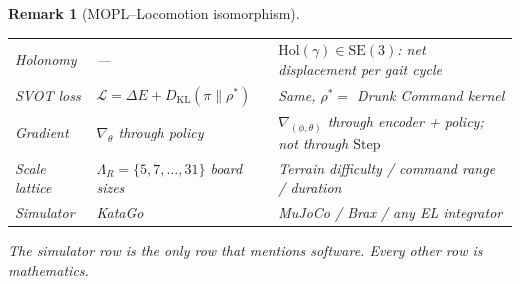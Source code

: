 \documentclass[11pt,a4paper]{article}
\newtheorem{remark}[theorem]{Remark}
\newcommand{\cL}{\mathcal{L}}
\newcommand{\DKL}{D_{\mathrm{KL}}}
\begin{document}
\begin{remark}[MOPL--Locomotion isomorphism]
\begin{center}
\begin{tabular}{@{}lp{4.8cm}p{5.8cm}@{}}
Holonomy
  & ---
  & $\mathrm{Hol}(\gamma) \in \mathrm{SE}(3)$:
    net displacement per gait cycle \\[3pt]
SVOT loss
  & $\cL = \Delta E
    + \DKL(\pi \| \rho^*)$
  & Same, $\rho^* = $ Drunk Command kernel \\[3pt]
Gradient
  & $\nabla_\theta$ through policy
  & $\nabla_{(\phi,\theta)}$ through
    encoder + policy; not through
    $\mathrm{Step}$ \\[3pt]
Scale lattice
  & $\Lambda_R = \{5,7,\ldots,31\}$
    board sizes
  & Terrain difficulty / command range /
    duration \\[3pt]
\midrule
Simulator
  & KataGo
  & MuJoCo / Brax / any EL integrator \\
\bottomrule
\end{tabular}
\end{center}

\medskip\noindent
The simulator row is the \emph{only} row that mentions
software.
Every other row is mathematics.
\end{remark}

\end{document}
